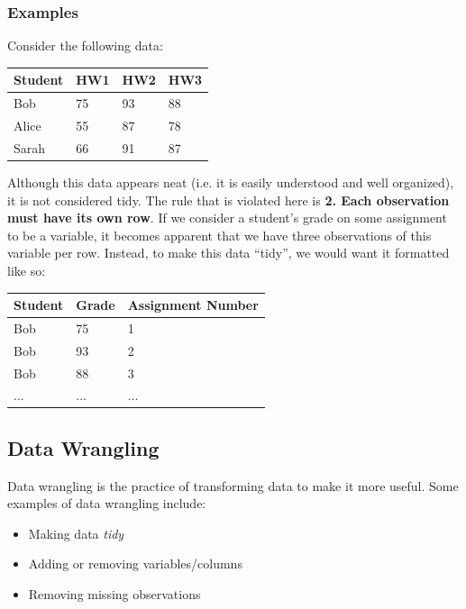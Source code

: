 \documentclass[10pt]{article}
\newcommand{\spacer}[0]{\par\vspace{0.1in}}
\begin{document}
\subsubsection{Examples}
Consider the following data:
\spacer
\begin{center}
    \begin{tabular}{|l|l|l|l|}
\hline
\rowcolor[HTML]{EFEFEF} 
\textbf{Student} & \textbf{HW1} & \textbf{HW2} & \textbf{HW3} \\ \hline
Bob              & 75           & 93           & 88           \\ \hline
Alice            & 55           & 87           & 78           \\ \hline
Sarah            & 66           & 91           & 87           \\ \hline
\end{tabular}
\end{center}
Although this data appears neat (i.e. it is easily understood and well organized), it is not considered tidy. The rule that is violated here is \textbf{2. Each observation must have its own row}. If we consider a student's grade on some assignment to be a variable, it becomes apparent that we have three observations of this variable per row. Instead, to make this data ``tidy'', we would want it formatted like so:
\begin{center}
    \begin{tabular}{|l|l|l|}
\hline
\rowcolor[HTML]{EFEFEF} 
\textbf{Student} & \textbf{Grade} & \textbf{Assignment Number} \\ \hline
Bob              & 75             & 1                          \\ \hline
Bob              & 93             & 2                          \\ \hline
Bob              & 88             & 3                          \\ \hline
...              & ...            & ...                        \\ \hline
\end{tabular}
\end{center}
\subsection{Data Wrangling}
Data wrangling is the practice of transforming data to make it more useful. Some examples of data wrangling include:
\begin{itemize}
    \item Making data \textit{tidy}
    \item Adding or removing variables/columns
    \item Removing missing observations
\end{itemize}
\end{document}
